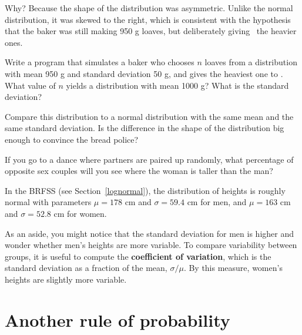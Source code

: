 \documentclass[12pt]{book}
\begin{document}
Why?  Because the shape of the distribution was asymmetric.  Unlike
the normal distribution, it was skewed to the right, which is
consistent with the hypothesis that the baker was still making 950 g
loaves, but deliberately giving \Poincare~the heavier ones.


\begin{ex}

Write a program that simulates a baker who chooses $n$ loaves from a
distribution with mean 950 g and standard deviation 50 g, and gives
the heaviest one to \Poincare.  What value of $n$ yields a
distribution with mean 1000 g?  What is the standard deviation?

Compare this distribution to a normal distribution with the same mean
and the same standard deviation.  Is the difference in the shape of
the distribution big enough to convince the bread police?

\end{ex}


\begin{ex}
\label{coef_var}

If you go to a dance where partners are paired up randomly, what
percentage of opposite sex couples will you see where the woman is
taller than the man?

In the BRFSS (see Section~\ref{lognormal}), the distribution of
heights is roughly normal with parameters $\mu=178$ cm and
$\sigma=59.4$ cm for men, and $\mu=163$ cm and $\sigma=52.8$ cm for
women.

As an aside, you might notice that the standard deviation for men is
higher and wonder whether men's heights are more variable.  To compare
variability between groups, it is useful to compute the {\bf
  coefficient of variation}, which is the standard deviation as a
fraction of the mean, $\sigma / \mu$.  By this measure, women's
heights are slightly more variable.


\end{ex}

\section{Another rule of probability}

\newcommand{\OR}{~\mbox{or}~}
\newcommand{\NOT}{~\mbox{not}~}
\end{document}

